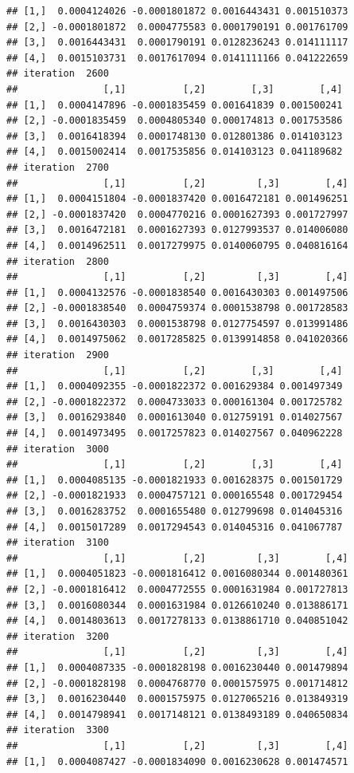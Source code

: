 \documentclass[
]{article}
\begin{document}
\begin{verbatim}
## [1,]  0.0004124026 -0.0001801872 0.0016443431 0.001510373
## [2,] -0.0001801872  0.0004775583 0.0001790191 0.001761709
## [3,]  0.0016443431  0.0001790191 0.0128236243 0.014111117
## [4,]  0.0015103731  0.0017617094 0.0141111166 0.041222659
## iteration  2600 
##               [,1]          [,2]        [,3]        [,4]
## [1,]  0.0004147896 -0.0001835459 0.001641839 0.001500241
## [2,] -0.0001835459  0.0004805340 0.000174813 0.001753586
## [3,]  0.0016418394  0.0001748130 0.012801386 0.014103123
## [4,]  0.0015002414  0.0017535856 0.014103123 0.041189682
## iteration  2700 
##               [,1]          [,2]         [,3]        [,4]
## [1,]  0.0004151804 -0.0001837420 0.0016472181 0.001496251
## [2,] -0.0001837420  0.0004770216 0.0001627393 0.001727997
## [3,]  0.0016472181  0.0001627393 0.0127993537 0.014006080
## [4,]  0.0014962511  0.0017279975 0.0140060795 0.040816164
## iteration  2800 
##               [,1]          [,2]         [,3]        [,4]
## [1,]  0.0004132576 -0.0001838540 0.0016430303 0.001497506
## [2,] -0.0001838540  0.0004759374 0.0001538798 0.001728583
## [3,]  0.0016430303  0.0001538798 0.0127754597 0.013991486
## [4,]  0.0014975062  0.0017285825 0.0139914858 0.041020366
## iteration  2900 
##               [,1]          [,2]        [,3]        [,4]
## [1,]  0.0004092355 -0.0001822372 0.001629384 0.001497349
## [2,] -0.0001822372  0.0004733033 0.000161304 0.001725782
## [3,]  0.0016293840  0.0001613040 0.012759191 0.014027567
## [4,]  0.0014973495  0.0017257823 0.014027567 0.040962228
## iteration  3000 
##               [,1]          [,2]        [,3]        [,4]
## [1,]  0.0004085135 -0.0001821933 0.001628375 0.001501729
## [2,] -0.0001821933  0.0004757121 0.000165548 0.001729454
## [3,]  0.0016283752  0.0001655480 0.012799698 0.014045316
## [4,]  0.0015017289  0.0017294543 0.014045316 0.041067787
## iteration  3100 
##               [,1]          [,2]         [,3]        [,4]
## [1,]  0.0004051823 -0.0001816412 0.0016080344 0.001480361
## [2,] -0.0001816412  0.0004772555 0.0001631984 0.001727813
## [3,]  0.0016080344  0.0001631984 0.0126610240 0.013886171
## [4,]  0.0014803613  0.0017278133 0.0138861710 0.040851042
## iteration  3200 
##               [,1]          [,2]         [,3]        [,4]
## [1,]  0.0004087335 -0.0001828198 0.0016230440 0.001479894
## [2,] -0.0001828198  0.0004768770 0.0001575975 0.001714812
## [3,]  0.0016230440  0.0001575975 0.0127065216 0.013849319
## [4,]  0.0014798941  0.0017148121 0.0138493189 0.040650834
## iteration  3300 
##               [,1]          [,2]         [,3]        [,4]
## [1,]  0.0004087427 -0.0001834090 0.0016230628 0.001474571

\end{verbatim}
\end{document}
